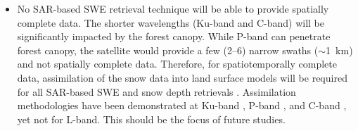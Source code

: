 \begin{enumerate}
\begin{itemize}
     \item No SAR-based SWE retrieval technique will be able to provide spatially complete data. The shorter wavelengths (Ku-band and C-band) will be significantly impacted by the forest canopy. While P-band can penetrate forest canopy, the satellite would provide a few (2--6) narrow swaths ($\sim$1~km) and not spatially complete data. Therefore, for spatiotemporally complete data, assimilation of the snow data into land surface models will be required for all SAR-based SWE and snow depth retrievals \citep{girottoDataAssimilationImproves2020}. Assimilation methodologies have been demonstrated at Ku-band \citep{wrzesienDevelopmentNatureRun2022, choEvaluatingUtilityActive2022}, P-band \citep{maEstimatingSpatiotemporallyContinuous2023}, and C-band \citep{girottoIdentifyingSnowfallElevation2023, brangersSentinel1SnowDepth}, yet not for L-band. This should be the focus of future studies.
    
   \end{itemize}
\end{enumerate}





